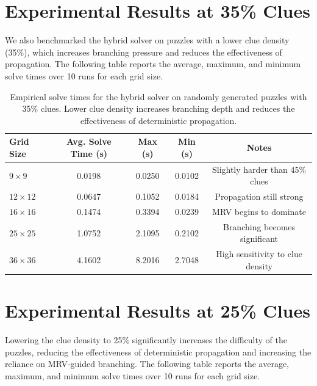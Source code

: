 \documentclass[11pt]{article}
\begin{document}
\section{Experimental Results at 35\% Clues}

We also benchmarked the hybrid solver on puzzles with a lower clue density (35\%),
which increases branching pressure and reduces the effectiveness of propagation.
The following table reports the average, maximum, and minimum solve times over
10 runs for each grid size.

\begin{table}[h]
\centering
\begin{tabular}{@{}lcccc@{}}
\toprule
Grid Size & Avg. Solve Time (s) & Max (s) & Min (s) & Notes \\
\midrule
$9 \times 9$   & 0.0198 & 0.0250 & 0.0102 & Slightly harder than 45\% clues \\
$12 \times 12$ & 0.0647 & 0.1052 & 0.0184 & Propagation still strong \\
$16 \times 16$ & 0.1474 & 0.3394 & 0.0239 & MRV begins to dominate \\
$25 \times 25$ & 1.0752 & 2.1095 & 0.2102 & Branching becomes significant \\
$36 \times 36$ & 4.1602 & 8.2016 & 2.7048 & High sensitivity to clue density \\
\bottomrule
\end{tabular}
\caption{Empirical solve times for the hybrid solver on randomly generated puzzles
with 35\% clues. Lower clue density increases branching depth and reduces the
effectiveness of deterministic propagation.}
\label{tab:times35}
\end{table}
\section{Experimental Results at 25\% Clues}

Lowering the clue density to 25\% significantly increases the difficulty of the
puzzles, reducing the effectiveness of deterministic propagation and increasing
the reliance on MRV-guided branching. The following table reports the average,
maximum, and minimum solve times over 10 runs for each grid size.
\end{document}
